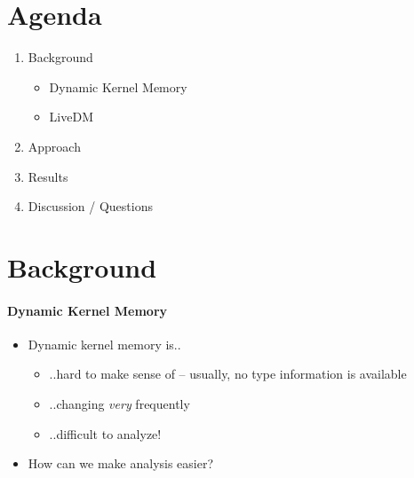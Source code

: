 \documentclass{i20lecture}
\subtitle{LiveDM - Proof of Concept}
\begin{document}
\frame{\titlepage}

\section{Agenda}
\begin{frame}{\insertsection}
  \begin{enumerate}
   \item Background
    \begin{itemize}
        \item Dynamic Kernel Memory
        \item LiveDM
    \end{itemize}
    \item Approach
    \item Results
    \item Discussion / Questions
  \end{enumerate}
\end{frame}

\section{Background}
\begin{frame}{\insertsection}
  \framesubtitle{Dynamic Kernel Memory}
  
  \begin{itemize}
    \item Dynamic kernel memory is..
    \begin{itemize}
\pause
    \item ..hard to make sense of -- usually, no type information is available
\pause
    \item ..changing \textit{very} frequently
\pause
    \item ..difficult to analyze!
    \end{itemize}
\pause
    \item How can we make analysis easier?
  \end{itemize}
\end{frame}
\end{document}
